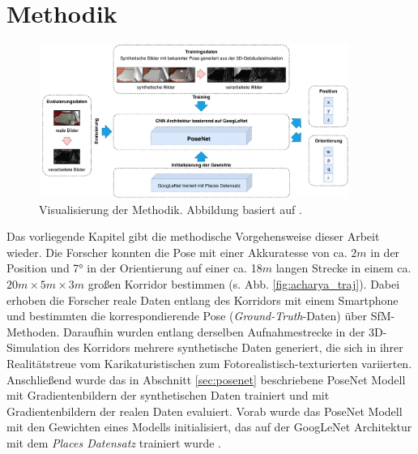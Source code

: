 
\section{Methodik}
\label{sec:kapitel_3}

\begin{figure}[t]
	\centering
	\includegraphics[width=0.9\textwidth]{images/methodik/methodik.pdf}
	\caption{Visualisierung der Methodik. Abbildung basiert auf \cite{acharyaBIMPoseNetIndoorCamera2019}.}
	\label{fig:methodik}
\end{figure}
Das vorliegende Kapitel gibt die methodische Vorgehensweise dieser Arbeit wieder. Die Forscher \citet{acharyaBIMPoseNetIndoorCamera2019} konnten die Pose mit einer Akkuratesse von ca. $2m$ in der Position und 7° in der Orientierung auf einer ca. 18$m$ langen Strecke in einem ca. $20m \times 5m \times 3m$ großen Korridor bestimmen (s. Abb. \ref{fig:acharya_traj}). Dabei erhoben die Forscher reale Daten entlang des Korridors mit einem Smartphone und bestimmten die korrespondierende Pose (\textit{Ground-Truth}-Daten) über SfM-Methoden. Daraufhin wurden entlang derselben Aufnahmestrecke in der 3D-Simulation des Korridors mehrere synthetische Daten generiert, die sich in ihrer Realitätstreue vom Karikaturistischen zum Fotorealistisch-texturierten variierten. Anschließend wurde das in Abschnitt \ref{sec:posenet} beschriebene PoseNet Modell mit Gradientenbildern der synthetischen Daten trainiert und mit Gradientenbildern der realen Daten evaluiert. Vorab wurde das PoseNet Modell mit den Gewichten eines Modells initialisiert, das auf der GoogLeNet Architektur mit dem \textit{Places Datensatz} \cite{NIPS2014_5349} trainiert wurde \cite{acharyaBIMPoseNetIndoorCamera2019}. 

